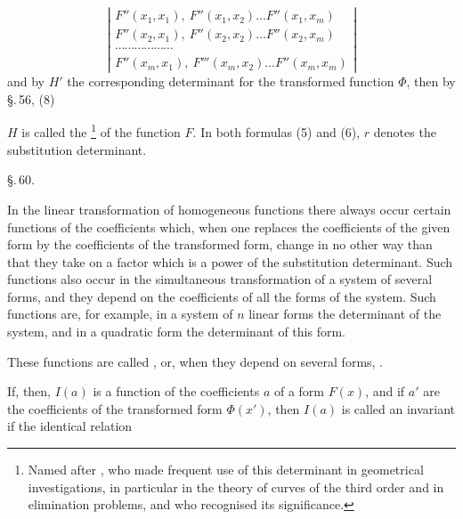 \[
\left|
\begin{array}{l}
F''(x_1, x_1),\ F''(x_1, x_2)\ldots F''(x_1, x_m) \\
F''(x_2, x_1),\ F''(x_2, x_2)\ldots F''(x_2, x_m) \\
\cdots\cdots\cdots\cdots\cdots\cdots \\
F''(x_m, x_1),\ F'''(x_m, x_2)\ldots F''(x_m, x_m) %
\end{array}
\right|
\]
and by $H'$ the corresponding determinant for the transformed
function $\Phi$, then by \S.\,56, (8)


$H$ is called the \footnote{Named after , who made frequent use of this determinant in geometrical investigations, in particular in the theory of curves of the third order and in elimination problems, and who recognised its significance.} of the function
$F$. In both formulas (5) and (6), $r$ denotes the substitution
determinant.

\begin{center}
\S.\,60.\\
\end{center}

In the linear transformation of homogeneous functions
there always occur certain functions of the coefficients which,
when one replaces the coefficients of the given form by the coefficients
of the transformed form, change in no other way than
that they take on a factor which is a power of the substitution
determinant. Such functions also occur in the simultaneous
transformation of a system of several forms, and they
depend on the coefficients of all the forms of the
system. Such functions are, for example, in a
system of $n$ linear forms the determinant of the system,
and in a quadratic form the determinant of this form.

These functions are called , or,
when they depend on several forms, .

If, then, $I(a)$ is a function of the coefficients $a$ of a
form $F(x)$, and if $a'$ are the coefficients of the transformed
form $\Phi(x')$, then $I(a)$ is called an invariant if the identical relation
